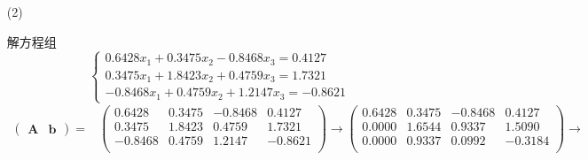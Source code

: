 \documentclass{sjtuarticle}
\begin{document}
\begin{itemize}
\begin{itemize}
\begin{proof}
            \begin{equation*}
                \bm{A}_2^\top=-a_{11}(\bm{m}_1\bm{m}_1^\top)^\top+\bm{A}_1^\top=-a_{11}(\bm{m}_1^\top)^\top\bm{m}_1^\top+\bm{A}_1^\top=-a_{11}\bm{m}_1\bm{m}_1^\top+\bm{A}_1 %
            \end{equation*}
            也就意味着
            \begin{equation*}
                \bm{A}_2=\bm{A}_2^\top
            \end{equation*}
            即 $\bm{A}_2$ 是对称矩阵。
        \end{proof}
        \item[(2)]\begin{solution}
            解方程组
            \begin{equation*}
                \begin{cases}
                    0.6428x_1+0.3475x_2-0.8468x_3=0.4127 \\
                    0.3475x_1+1.8423x_2+0.4759x_3=1.7321 \\
                    -0.8468x_1+0.4759x_2+1.2147x_3=-0.8621 
                \end{cases}
            \end{equation*}
            \begin{align*}
                \begin{pmatrix}
                    \bm{A} & \bm{b}
                \end{pmatrix}=&
                \begin{pmatrix}
                0.6428 &       0.3475 &      -0.8468 &        0.4127\\
                0.3475 &       1.8423 &       0.4759 &        1.7321\\
               -0.8468 &       0.4759 &       1.2147 &       -0.8621\\
          \end{pmatrix}\rightarrow
          \begin{pmatrix}
                0.6428 &       0.3475 &      -0.8468 &        0.4127\\
                0.0000 &       1.6544 &       0.9337 &        1.5090\\
                0.0000 &       0.9337 &       0.0992 &       -0.3184\\
          \end{pmatrix}\rightarrow\\

\end{align*}
\end{solution}
\end{itemize}
\end{itemize}
\end{document}
